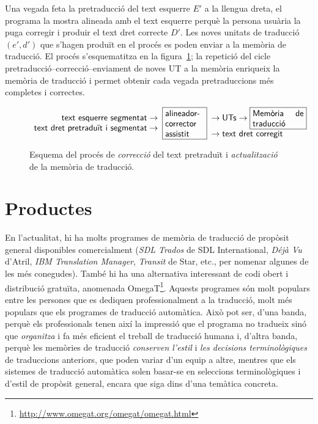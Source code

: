 Una vegada feta la pretraducció del text esquerre $E'$ a la llengua
dreta, el programa la mostra alineada amb el text esquerre perquè la
persona usuària la puga corregir i produir el text dret
correcte $D'$. Les noves unitats de traducció $(e',d')$ que s'hagen produït en
el procés es poden enviar a la memòria de traducció. El procés
s'esquematitza en la figura~\ref{fg:corMT}; la repetició del cicle
pretraducció--correcció--enviament de noves UT a la memòria enriqueix
la memòria de traducció i permet obtenir cada vegada pretraduccions
més completes i correctes.
\begin{figure}
$$
\begin{array}{r}
\mbox{\textsf{text esquerre segmentat}} \to \\
\mbox{\textsf{text dret pretraduït i segmentat}} \to \\ \end{array}
\mbox{\framebox{\parbox{1.6cm}{\textsf{alineador- corrector assistit}}}}
\begin{array}{l}\to \mbox{\textsf{UTs}} \to
  \mbox{\framebox{\parbox{2.1cm}{\textsf{Memòria de traducció}}}} \\
  \to \mbox{\textsf{text dret corregit}}\end{array}
$$
\caption{Esquema del procés de \emph{correcció} del text pretraduït i
  \emph{actualització} de la memòria de traducció.}
\label{fg:corMT}


\end{figure}




\section{Productes}

En l'actualitat, hi ha molts programes de memòria de traducció de
propòsit general disponibles comercialment (\emph{SDL Trados} de SDL
International, \emph{Déjà
  Vu} d'Atril, \emph{IBM Translation Manager}, \emph{Transit} de Star,
etc., per nomenar algunes de les més
conegudes). També hi ha una alternativa interessant de codi obert i
distribució gratuïta, anomenada
OmegaT\footnote{\url{http://www.omegat.org/omegat/omegat.html}}. Aquests programes són molt populars entre les persones que
es dediquen professionalment a la traducció, molt més populars que els
programes de traducció automàtica. Això pot ser, d'una banda, perquè
els professionals tenen així la impressió que el programa no tradueix
sinó que \emph{organitza} i fa més eficient el treball de traducció
humana i, d'altra banda, perquè les memòries de traducció
\emph{conserven l'estil} i \emph{les decisions terminològiques} de
traduccions anteriors, que poden variar d'un equip a altre, mentres
que els sistemes de traducció automàtica solen basar-se en seleccions
terminològiques i d'estil de propòsit general, encara que siga dins
d'una temàtica concreta.

